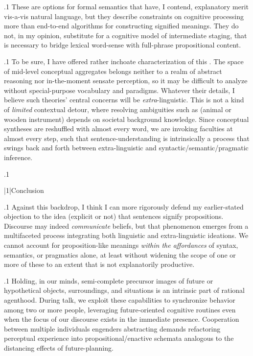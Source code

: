\documentclass[11pt, twocolumn]{article}
\begin{document}
\p.1{%
These are options for formal semantics that have, I contend,
explanatory merit vis-a-vis natural language, but they describe
constraints on cognitive processing more than end-to-end
algorithms for constructing signified meanings.
They do not, in my opinion, substitute for a cognitive
model of intermediate staging, that is necessary
to bridge lexical word-sense with full-phrase propositional content.
} %

\p.1{%
To be sure, I have offered rather inchoate characterization
of this .  The space of mid-level conceptual
aggregates belongs neither to a realm of abstract reasoning nor
in-the-moment sensate perception, so it may be difficult to
analyze without special-purpose vocabulary and paradigms.
Whatever their details, I believe such theories' central
concerns will be \textit{extra}-linguistic.  This is not a kind
of \textit{limited} contextual detour, where resolving
ambiguities such as  (animal or wooden instrument) depends on
societal background knowledge.  Since conceptual syntheses are
reshuffled with almost every word, we are
invoking  faculties at almost every
step, such that sentence-understanding is intrinsically a
process that swings back and forth between
extra-linguistic and syntactic/semantic/pragmatic inference.
} %

\p.1{%
\vspace{5pt}
} %


\s|1|{Conclusion}

\p.1{%
Against this backdrop, I think I can more rigorously
defend my earlier-stated objection to the
idea (explicit or not) that sentences signify propositions.
Discourse may indeed \textit{communicate} beliefs,
but that phenomenon emerges from a multifaceted
process integrating both linguistic and extra-linguistic
ideations.  We cannot account for proposition-like
meanings \textit{within the affordances} of syntax, semantics,
or pragmatics alone, at least without widening the scope
of one or more of these to an extent that is not explanatorily
productive.
} %

\p.1{%
Holding, in our minds, semi-complete precursor images of
future or hypothetical objects, surroundings, and
situations is an intrinsic part of rational agenthood.
During talk, we exploit these capabilities
to synchronize behavior among two or more people,
leveraging future-oriented cognitive routines even
when the focus of our discourse exists in the immediate
presence.  Cooperation between multiple individuals engenders
abstracting demands \mdash{} refactoring perceptual experience
into propositional/enactive schemata \mdash{} analogous to
the distancing effects of future-planning.
} %
\end{document}
